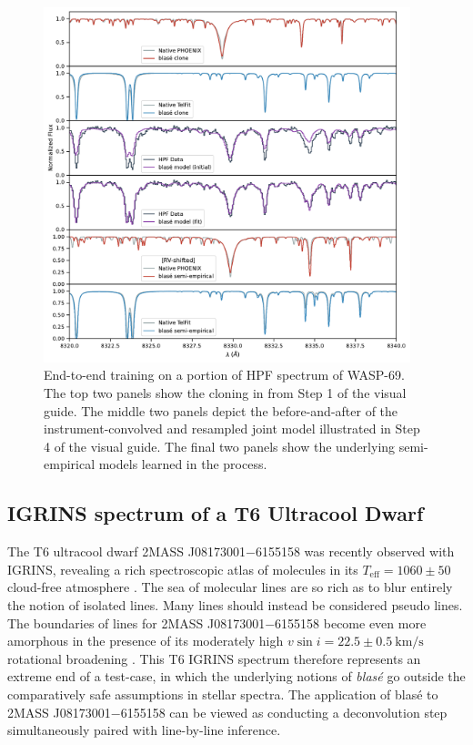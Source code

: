 \documentclass[twocolumn]{aastex631}
\begin{document}
\begin{figure}[hbt!]
    \centering
    \includegraphics[width=0.95\textwidth]{WASP_69_multi.pdf}
    \caption{End-to-end training on a portion of HPF spectrum of WASP-69. The top two panels show the cloning in from Step 1 of the visual guide.  The middle two panels depict the before-and-after of the instrument-convolved and resampled joint model illustrated in Step 4 of the visual guide.  The final two panels show the underlying semi-empirical models learned in the process.}
    \label{fig_multi_panel_WASP69}
\end{figure}


\subsection{IGRINS spectrum of a T6 Ultracool Dwarf}

The T6 ultracool dwarf 2MASS J08173001$-$6155158 was recently observed with IGRINS, revealing a rich spectroscopic atlas of molecules in its $T_\mathrm{eff} = 1060 \pm 50$ cloud-free atmosphere \citep{2022MNRAS.tmp.1421T}.  The sea of molecular lines are so rich as to blur entirely the notion of isolated lines.  Many lines should instead be considered pseudo lines.  The boundaries of lines for 2MASS J08173001$-$6155158 become even more amorphous in the presence of its moderately high $v\sin{i} = 22.5\pm 0.5 ~ \text{km/s}$ rotational broadening \citep{2022MNRAS.tmp.1421T}.  This T6 IGRINS spectrum therefore represents an extreme end of a test-case, in which the underlying notions of \emph{blas\'e} go outside the comparatively safe assumptions in stellar spectra.  The application of blas\'e to 2MASS J08173001$-$6155158 can be viewed as conducting a deconvolution step simultaneously paired with line-by-line inference.
\end{document}
